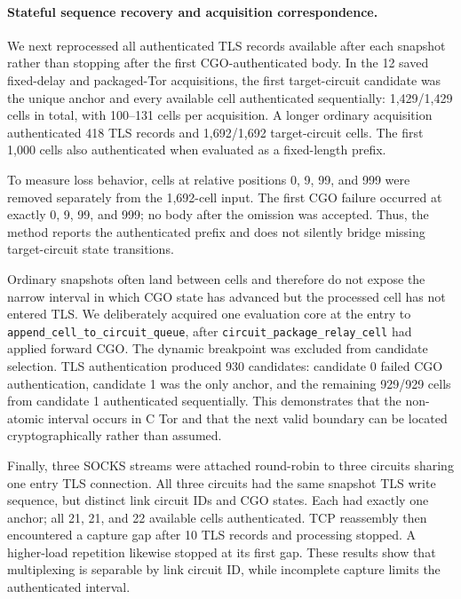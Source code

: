 \documentclass[10pt,a4paper]{article}
\newcommand{\code}[1]{\nolinkurl{#1}}
\begin{document}
\paragraph{Stateful sequence recovery and acquisition correspondence.}
We next reprocessed all authenticated TLS records available after each snapshot rather than stopping after the first CGO-authenticated body. In the 12 saved fixed-delay and packaged-Tor acquisitions, the first target-circuit candidate was the unique anchor and every available cell authenticated sequentially: 1,429/1,429 cells in total, with 100--131 cells per acquisition. A longer ordinary acquisition authenticated 418 TLS records and 1,692/1,692 target-circuit cells. The first 1,000 cells also authenticated when evaluated as a fixed-length prefix.

To measure loss behavior, cells at relative positions 0, 9, 99, and 999 were removed separately from the 1,692-cell input. The first CGO failure occurred at exactly 0, 9, 99, and 999; no body after the omission was accepted. Thus, the method reports the authenticated prefix and does not silently bridge missing target-circuit state transitions.

Ordinary snapshots often land between cells and therefore do not expose the narrow interval in which CGO state has advanced but the processed cell has not entered TLS. We deliberately acquired one evaluation core at the entry to \code{append_cell_to_circuit_queue}, after \code{circuit_package_relay_cell} had applied forward CGO. The dynamic breakpoint was excluded from candidate selection. TLS authentication produced 930 candidates: candidate 0 failed CGO authentication, candidate 1 was the only anchor, and the remaining 929/929 cells from candidate 1 authenticated sequentially. This demonstrates that the non-atomic interval occurs in C Tor and that the next valid boundary can be located cryptographically rather than assumed.

Finally, three SOCKS streams were attached round-robin to three circuits sharing one entry TLS connection. All three circuits had the same snapshot TLS write sequence, but distinct link circuit IDs and CGO states. Each had exactly one anchor; all 21, 21, and 22 available cells authenticated. TCP reassembly then encountered a capture gap after 10 TLS records and processing stopped. A higher-load repetition likewise stopped at its first gap. These results show that multiplexing is separable by link circuit ID, while incomplete capture limits the authenticated interval.
\end{document}
